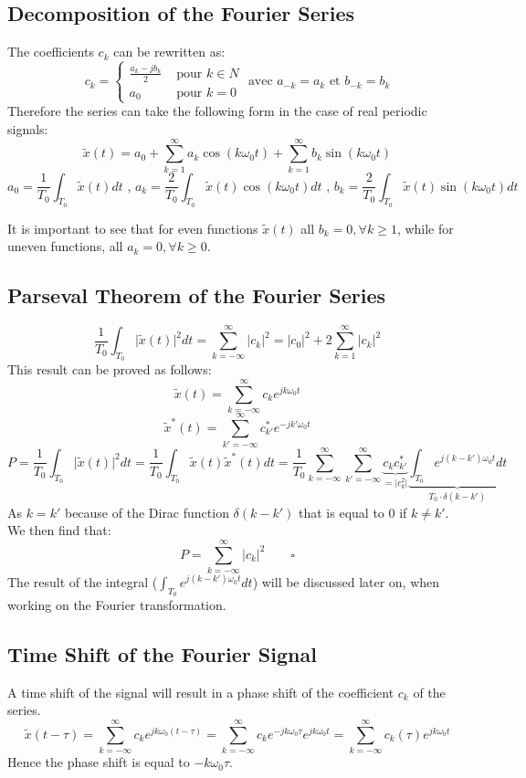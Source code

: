 \documentclass[10pt,a4paper]{article}
\begin{document}
\subsection{Decomposition of the Fourier Series}
The coefficients $c_k$ can be rewritten as:
$$
c_k = 
\begin{cases} 
	\frac{a_k - jb_k}{2} & \text{ pour } k \in N \\
	a_0 				 & \text{ pour } k = 0
\end{cases}
\text{ avec } a_{-k} = a_k \text{ et } b_{-k} = b_k
$$
\noindent
Therefore the series can take the following form in the case of real periodic signals: 
$$
\boxed{
\tilde{x}(t) = a_0 + \sum_{k=1}^{\infty}{a_k \cos(k \omega_0 t)}
				   + \sum_{k=1}^{\infty}{b_k \sin(k \omega_0 t)}
}
$$
$$
a_0 = \frac{1}{T_0} \int_{T_0}{ \tilde{x}(t) dt } \text{ , }
a_k = \frac{2}{T_0} \int_{T_0}{ \tilde{x}(t) \cos(k \omega_0 t) dt } \text{ , }
b_k = \frac{2}{T_0} \int_{T_0}{ \tilde{x}(t) \sin(k \omega_0 t) dt }
$$

It is important to see that for even functions $\tilde{x}(t)$ all $b_k = 0, \forall k \geq 1$, while for uneven functions, all $a_k = 0, \forall k \geq 0$. 

\subsection{Parseval Theorem of the Fourier Series}
$$
\boxed{
\frac{1}{T_0} \int_{T_0}{\vert \tilde{x}(t) \vert^2 dt}
= \sum_{k=-\infty}^{\infty}{ \vert c_k \vert^2 }
= \vert c_0 \vert^2 + 2 \sum_{k=1}^{\infty}{ \vert c_k \vert^2 }
}
$$
\noindent
This result can be proved as follows: 
$$
\tilde{x}(t) = \sum_{k=-\infty}^{\infty}{c_k e^{j k \omega_0 t}}
$$
$$
\tilde{x}^*(t) = \sum_{k'=-\infty}^{\infty}{c_{k'}^* e^{-j k' \omega_0 t}}
$$
$$
P = \frac{1}{T_0} \int_{T_0}\vert \tilde{x}(t) \vert^2 dt
  = \frac{1}{T_0} \int_{T_0} \tilde{x}(t) \tilde{x}^*(t) dt
  = \frac{1}{T_0} \sum_{k=-\infty}^{\infty} \sum_{k'=-\infty}^{\infty} 
    \underbrace{c_k c_{k'}^*}_{= \vert c_k^2 \vert}
    \underbrace{\int_{T_0} e^{j (k-k') \omega_0 t} dt}_{T_0 \cdot \delta(k-k')}
$$
As $k = k'$ because of the Dirac function $\delta(k-k')$ that is equal to $0$ if $k \neq k'$. We then find that: 
$$
P = \sum_{k=-\infty}^{\infty}{ \vert c_k \vert^2 } \qquad \square
$$
The result of the integral ($\int_{T_0} e^{j (k-k') \omega_0 t} dt$) will be discussed later on, when working on the Fourier transformation. 

\subsection{Time Shift of the Fourier Signal}
A time shift of the signal will result in a phase shift of the coefficient $c_k$ of the series. 
$$
\tilde{x}(t - \tau) = \sum_{k=-\infty}^{\infty} {c_ke^{j k \omega_0 (t - \tau)}}
					= \sum_{k=-\infty}^{\infty} {c_ke^{-j k \omega_0 \tau} e^{j k \omega_0 t}}
					= \sum_{k=-\infty}^{\infty} {c_k(\tau) e^{j k \omega_0 t}}
$$
Hence the phase shift is equal to $-k \omega_0 \tau$. 
\end{document}

